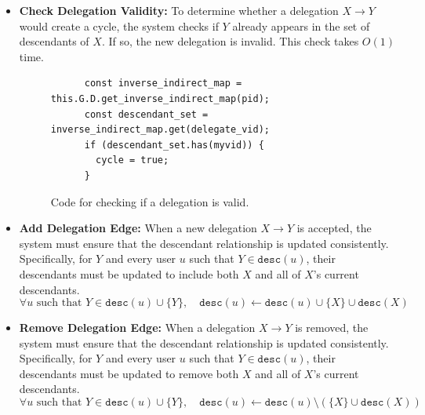 \begin{itemize}
  \item \textbf{Check Delegation Validity:} To determine whether a delegation \(X \!\to\! Y\) would create a cycle, the system checks if \(Y\) already appears in the set of descendants of \(X\). If so, the new delegation is invalid. This check takes \(O(1)\) time.
  \begin{figure}[H]
    \centering
    \begin{verbatim}
      const inverse_indirect_map = this.G.D.get_inverse_indirect_map(pid);
      const descendant_set = inverse_indirect_map.get(delegate_vid);
      if (descendant_set.has(myvid)) {
        cycle = true;
      }
    \end{verbatim}
    \caption{Code for checking if a delegation is valid.}
  \end{figure}

  \item \textbf{Add Delegation Edge:} When a new delegation \(X \to Y\) is accepted, the system must ensure that the descendant relationship is updated consistently. Specifically, for $Y$ and every user \(u\) such that \(Y \in \texttt{desc}(u)\), their descendants must be updated to include both \(X\) and all of \(X\)'s current descendants.
\[
  \forall u \text{ such that } Y \in \texttt{desc}(u) \cup \{Y\},\quad \texttt{desc}(u) \leftarrow \texttt{desc}(u) \cup \{X\} \cup \texttt{desc}(X)
\]

  \item \textbf{Remove Delegation Edge:} When a delegation \(X \!\to\! Y\) is removed, the system must ensure that the descendant relationship is updated consistently. Specifically, for $Y$ and every user \(u\) such that \(Y \in \texttt{desc}(u)\), their descendants must be updated to remove both \(X\) and all of \(X\)'s current descendants.
\[
  \forall u \text{ such that } Y \in \texttt{desc}(u) \cup \{Y\},\quad \texttt{desc}(u) \leftarrow \texttt{desc}(u) \setminus \left( \{X\} \cup \texttt{desc}(X) \right)
\]
\end{itemize}

    
